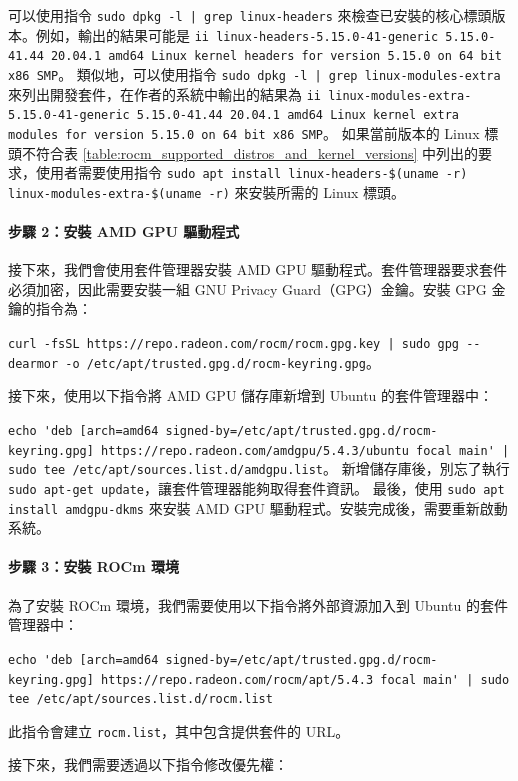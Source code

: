 可以使用指令 \lstinline!sudo dpkg -l | grep linux-headers! 來檢查已安裝的核心標頭版本。例如，輸出的結果可能是 \lstinline|ii linux-headers-5.15.0-41-generic 5.15.0-41.44 20.04.1 amd64 Linux kernel headers for version 5.15.0 on 64 bit x86 SMP|。
類似地，可以使用指令 \lstinline!sudo dpkg -l | grep linux-modules-extra! 來列出開發套件，在作者的系統中輸出的結果為
\lstinline|ii linux-modules-extra-5.15.0-41-generic 5.15.0-41.44 20.04.1 amd64 Linux kernel extra modules for version 5.15.0 on 64 bit x86 SMP|。
如果當前版本的 Linux 標頭不符合表 \ref{table:rocm_supported_distros_and_kernel_versions} 中列出的要求，使用者需要使用指令 \lstinline|sudo apt install linux-headers-$(uname -r) linux-modules-extra-$(uname -r)| 來安裝所需的 Linux 標頭。


\paragraph{步驟 2：安裝 AMD GPU 驅動程式}
接下來，我們會使用套件管理器安裝 AMD GPU 驅動程式。套件管理器要求套件必須加密，因此需要安裝一組 GNU Privacy Guard（GPG）金鑰。安裝 GPG 金鑰的指令為：

\lstinline!curl -fsSL https://repo.radeon.com/rocm/rocm.gpg.key | sudo gpg --dearmor -o /etc/apt/trusted.gpg.d/rocm-keyring.gpg!。

接下來，使用以下指令將 AMD GPU 儲存庫新增到 Ubuntu 的套件管理器中：

\lstinline!echo 'deb [arch=amd64 signed-by=/etc/apt/trusted.gpg.d/rocm-keyring.gpg] https://repo.radeon.com/amdgpu/5.4.3/ubuntu focal main' | sudo tee /etc/apt/sources.list.d/amdgpu.list!。
新增儲存庫後，別忘了執行 \lstinline|sudo apt-get update|，讓套件管理器能夠取得套件資訊。
最後，使用 \lstinline|sudo apt install amdgpu-dkms| 來安裝 AMD GPU 驅動程式。安裝完成後，需要重新啟動系統。

\paragraph{步驟 3：安裝 ROCm 環境}
為了安裝 ROCm 環境，我們需要使用以下指令將外部資源加入到 Ubuntu 的套件管理器中：

\lstinline!echo 'deb [arch=amd64 signed-by=/etc/apt/trusted.gpg.d/rocm-keyring.gpg] https://repo.radeon.com/rocm/apt/5.4.3 focal main' | sudo tee /etc/apt/sources.list.d/rocm.list!

此指令會建立 \lstinline|rocm.list|，其中包含提供套件的 URL。

接下來，我們需要透過以下指令修改優先權：

